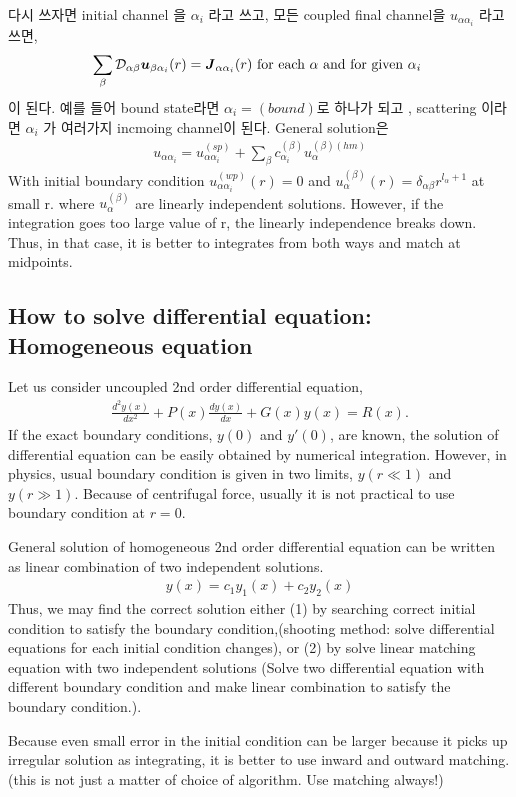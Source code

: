\documentclass[10pt]{book}
\def\bm{\boldsymbol}
\newcommand{\bea}{\begin{eqnarray}}
\newcommand{\eea}{\end{eqnarray}}
\begin{document}
다시 쓰자면 initial channel 을 $\alpha_i$ 라고 쓰고, 모든 
coupled final channel을 $u_{\alpha\alpha_i}$ 라고 쓰면, 
\bea 
\sum_{\beta}{\cal D}_{\alpha\beta}{\bm u}_{\beta\alpha_i}(r)={\bm J}_{\alpha\alpha_i}(r) 
\mbox{ for each $\alpha$ and for given $\alpha_i$ }
\eea  
이 된다. 예를 들어 bound state라면 $\alpha_i=(bound)$로 하나가 되고 , scattering 이라면 
$\alpha_i$ 가 여러가지 incmoing channel이 된다. 
General solution은 
\bea 
u_{\alpha\alpha_i}=u_{\alpha\alpha_i}^{(sp)}
      +\sum_{\beta} c_{\alpha_i}^{(\beta)} u_{\alpha}^{(\beta)(hm)}
\eea 
With initial boundary condition 
$u_{\alpha\alpha_i}^{(wp)}(r)=0 $ and
$u_{\alpha}^{(\beta)}(r)=\delta_{\alpha\beta} r^{l_\alpha+1}$ at small r.
where $u_\alpha^{(\beta)}$ are linearly independent solutions.  However, 
if the integration goes too large value of r, the linearly independence breaks down.
Thus, in that case, it is better to integrates from both ways and match at midpoints.  

\subsection{How to solve differential equation: Homogeneous equation }
Let us consider uncoupled 2nd order differential equation,
\bea 
\frac{d^2 y(x)}{dx^2}+P(x)\frac{d y(x)}{dx}+G(x)y(x)=R(x).
\eea 
If the exact boundary conditions, $y(0)$ and $y'(0)$, are known,
the solution of differential equation can be easily obtained by 
numerical integration. However, in physics, usual boundary condition is 
given in two limits, $y(r\ll 1)$ and $y(r\gg 1)$. Because of centrifugal
force, usually it is not practical to use  boundary condition at $r=0$.

General solution of homogeneous 2nd order differential equation can be written 
as linear combination of two independent solutions.
\bea 
y(x)=c_1 y_1(x) +c_2 y_2(x)
\eea 
Thus, we may find the correct solution either 
(1) by searching correct initial condition to satisfy
the boundary condition,(shooting method:
solve differential equations for each initial condition changes),
or (2) by solve linear matching equation with two independent solutions
(Solve two differential equation with different boundary condition 
and make linear combination to satisfy the boundary condition.). 

Because even small error in the initial condition can be larger 
because it picks up irregular solution as integrating, 
it is better to use inward and outward matching. 
(this is not just a matter of choice of algorithm. Use matching always!)
\end{document}
